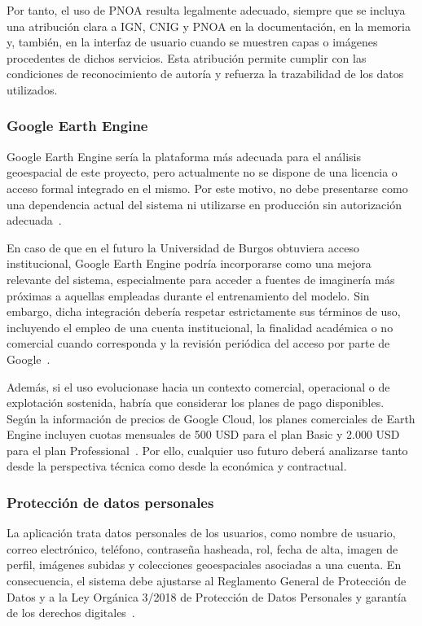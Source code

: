 Por tanto, el uso de PNOA resulta legalmente adecuado, siempre que se incluya una atribución clara a IGN, CNIG y PNOA en la documentación, en la memoria y, también, en la interfaz de usuario cuando se muestren capas o imágenes procedentes de dichos servicios. Esta atribución permite cumplir con las condiciones de reconocimiento de autoría y refuerza la trazabilidad de los datos utilizados.

\subsubsection{Google Earth Engine}

Google Earth Engine sería la plataforma más adecuada para el análisis geoespacial de este proyecto, pero actualmente no se dispone de una licencia o acceso formal integrado en el mismo. Por este motivo, no debe presentarse como una dependencia actual del sistema ni utilizarse en producción sin autorización adecuada~\cite{googleearthengine_terms}.

En caso de que en el futuro la Universidad de Burgos obtuviera acceso institucional, Google Earth Engine podría incorporarse como una mejora relevante del sistema, especialmente para acceder a fuentes de imaginería más próximas a aquellas empleadas durante el entrenamiento del modelo. Sin embargo, dicha integración debería respetar estrictamente sus términos de uso, incluyendo el empleo de una cuenta institucional, la finalidad académica o no comercial cuando corresponda y la revisión periódica del acceso por parte de Google~\cite{googleearthengine_terms}.

Además, si el uso evolucionase hacia un contexto comercial, operacional o de explotación sostenida, habría que considerar los planes de pago disponibles. Según la información de precios de Google Cloud, los planes comerciales de Earth Engine incluyen cuotas mensuales de 500 USD para el plan Basic y 2.000 USD para el plan Professional~\cite{googleearthengine_pricing}. Por ello, cualquier uso futuro deberá analizarse tanto desde la perspectiva técnica como desde la económica y contractual.

\subsubsection{Protección de datos personales}

La aplicación trata datos personales de los usuarios, como nombre de usuario, correo electrónico, teléfono, contraseña hasheada, rol, fecha de alta, imagen de perfil, imágenes subidas y colecciones geoespaciales asociadas a una cuenta. En consecuencia, el sistema debe ajustarse al Reglamento General de Protección de Datos y a la Ley Orgánica 3/2018 de Protección de Datos Personales y garantía de los derechos digitales~\cite{rgpd_2016,lopdgdd_2018}.

